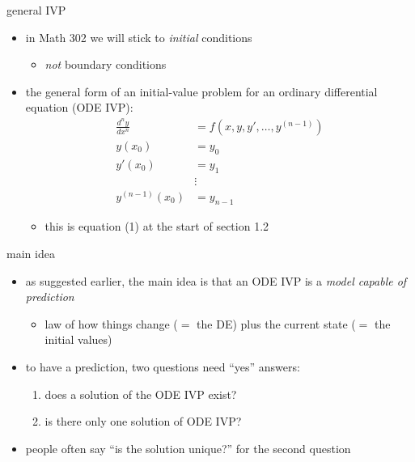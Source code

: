 \documentclass{beamer}
\begin{document}
\begin{frame}{general IVP}

\begin{itemize}
\item in Math 302 we will stick to \emph{initial} conditions
    \begin{itemize}
    \item \emph{not} boundary conditions
    \end{itemize}
\item the general form of an initial-value problem for an ordinary differential equation (ODE IVP):
\begin{align*}
\frac{d^n y}{dx^n} &= f(x,y,y',\dots,y^{(n-1)}) \\
y(x_0) &= y_0 \\
y'(x_0) &= y_1 \\
   &\vdots \\
y^{(n-1)}(x_0) &= y_{n-1}
\end{align*}

\vspace{-1mm}
     \begin{itemize}
     \item this is equation (1) at the start of section 1.2
     \end{itemize}
\end{itemize}
\end{frame}


\begin{frame}{main idea}

\begin{itemize}
\item as suggested earlier, the main idea is that an ODE IVP is a \emph{model capable of prediction}
    \begin{itemize}
    \item law of how things change ($=$ the DE) plus the current state ($=$ the initial values)
    \end{itemize}
\item to have a prediction, two questions need ``yes'' answers:
    \begin{enumerate}
    \item does a solution of the ODE IVP exist?
    \item is there only one solution of ODE IVP?
    \end{enumerate}
\item people often say ``is the solution unique?'' for the second question
\end{itemize}
\end{frame}
\end{document}
